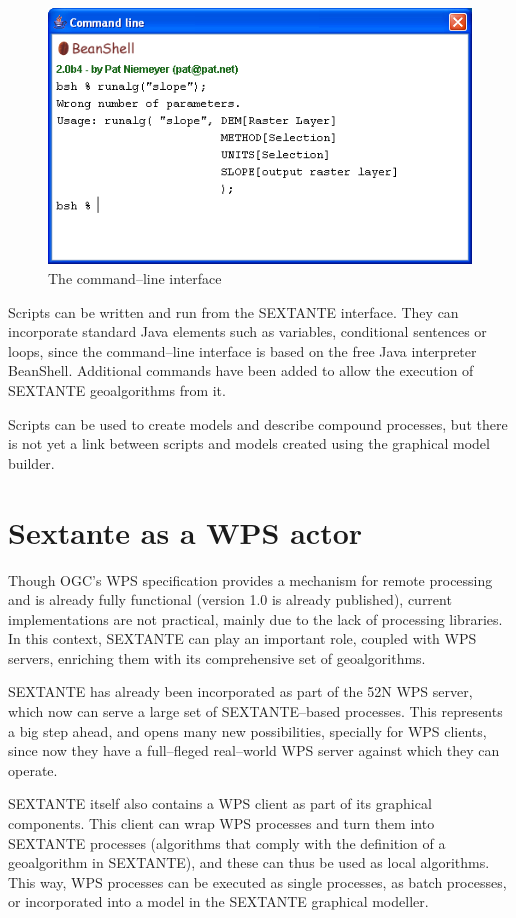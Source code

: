 \documentclass[12pt,a4paper,twocolumn]{article}
\begin{document}
\begin{figure} [!hbt]
 \centering
 \includegraphics[width=.8\columnwidth]{CommandLine.png}
\caption{The command--line interface}
\label{Fig:CommandLine}
\end{figure}

Scripts can be written and run from the SEXTANTE interface. They can incorporate standard Java elements such as variables, conditional sentences or loops, since the command--line interface is based on the free Java interpreter BeanShell. Additional commands have been added to allow the execution of SEXTANTE geoalgorithms from it.

Scripts can be used to create models and describe compound processes, but there is not yet a link between scripts and models created using the graphical model builder.

\section{Sextante as a WPS actor}

Though OGC's WPS specification provides a mechanism for remote processing and is already fully functional (version 1.0 is already published), current implementations are not practical, mainly due to the lack of processing libraries. In this context, SEXTANTE can play an important role, coupled with WPS servers, enriching them with its comprehensive set of geoalgorithms. 

SEXTANTE has already been incorporated as part of the 52N WPS server, which now can serve a large set of SEXTANTE--based processes. This represents a big step ahead, and opens many new possibilities, specially for WPS clients, since now they have a full--fleged real--world WPS server against which they can operate.

SEXTANTE itself also contains a WPS client as part of its graphical components. This client can wrap WPS processes and turn them into SEXTANTE processes (algorithms that comply with the definition of a geoalgorithm in SEXTANTE), and these can thus be used as local algorithms. This way, WPS processes can be executed as single processes, as batch processes, or incorporated into a model in the SEXTANTE graphical modeller. 
\end{document}
